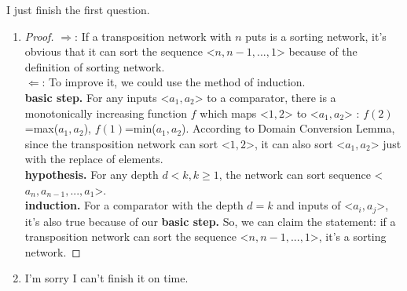 \documentclass[12pt,a4paper]{article}
\makeatletter
\newtheorem*{solution}{Solution}
\theoremstyle{definition}
\renewenvironment{solution}[1][Solution] {\par\pushQED{\qed}\normalfont\topsep6\p@\@plus6\p@\relax\trivlist\item[\hskip\labelsep\bfseries#1\@addpunct{.}]\ignorespaces}{\popQED\endtrivlist\@endpefalse} \makeatother
\makeatother
\begin{document}
\begin{solution}
    I just finish the first question.
    \begin{enumerate}[label=(\alph*)]
        \item  
              \begin{proof}
                $\Rightarrow$: If a transposition network with $n$ puts is a sorting network, it's obvious that it can sort the sequence <$n, n-1,...,1$> because of the definition of sorting network.
                \\$\Leftarrow$: To improve it, we could use the method of induction.
                \\\textbf{basic step.} For any inputs <$a_1,a_2$> to a comparator, there is a monotonically increasing function $f$ which maps <$1,2$> to <$a_1,a_2$> : $f(2)$=max($a_1,a_2$), $f(1)$=min($a_1,a_2$). According to Domain Conversion Lemma, since the transposition network can sort <$1,2$>, it can also sort <$a_1,a_2$> just with the replace of elements.
                \\\textbf{hypothesis.} For any depth $d< k, k\geqslant 1$, the network can sort sequence <$a_n,a_{n-1},...,a_1$>.
                \\\textbf{induction.} For a comparator with the depth $d=k$ and inputs of <$a_i,a_j$>, it's also true because of our \textbf{basic step.} So, we can claim the statement: if a transposition network can sort the sequence <$n,n-1,...,1$>, it's a sorting network.
              \end{proof}
        \item I'm sorry I can't finish it on time.
    \end{enumerate}
\end{solution}
\end{document}
